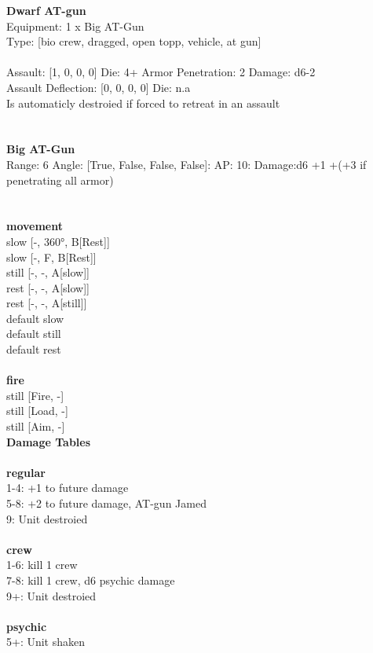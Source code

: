 {\bf Dwarf AT-gun } \\
Equipment: 1 x Big AT-Gun \\
Type: [bio crew, dragged, open topp, vehicle, at gun] \\
\ \\
Assault: [1, 0, 0, 0] Die: 4+ Armor Penetration: 2 Damage: d6-2 \\
Assault Deflection: [0, 0, 0, 0] Die: n.a\\
\indent Is automaticly destroied if forced to retreat in an assault\\ 
 
\ \\

\ \\
{\bf Big AT-Gun } \\



Range: 6  Angle: [True, False, False, False]: AP: 10: Damage:d6 +1 +(+3 if penetrating all armor) \\




 
\ \\




\ \\ {\bf movement } \\
slow [-, 360°, B[Rest]] \\
slow [-, F, B[Rest]] \\
still [-, -, A[slow]] \\
rest [-, -, A[slow]] \\
rest [-, -, A[still]] \\
default slow \\
default still \\
default rest \\
\ \\ {\bf fire } \\
still [Fire, -] \\
still [Load, -] \\
still [Aim, -] \\


{\bf Damage Tables} \\
\ \\ {\bf regular } \\
1-4: +1 to future damage \\
5-8: +2 to future damage, AT-gun Jamed \\
9: Unit destroied \\
\ \\ {\bf crew } \\
1-6: kill 1 crew \\
7-8: kill 1 crew, d6 psychic damage \\
9+: Unit destroied \\
\ \\ {\bf psychic } \\
5+: Unit shaken \\










